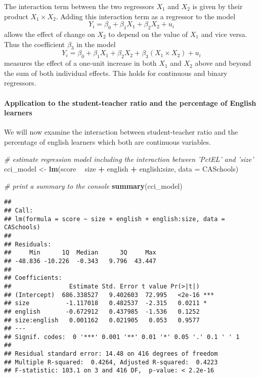 \documentclass[]{book}
\newenvironment{Shaded}{\begin{snugshade}}{\end{snugshade}}
\newcommand{\KeywordTok}[1]{\textcolor[rgb]{0.13,0.29,0.53}{\textbf{#1}}}
\newcommand{\DataTypeTok}[1]{\textcolor[rgb]{0.13,0.29,0.53}{#1}}
\newcommand{\StringTok}[1]{\textcolor[rgb]{0.31,0.60,0.02}{#1}}
\newcommand{\CommentTok}[1]{\textcolor[rgb]{0.56,0.35,0.01}{\textit{#1}}}
\newcommand{\OperatorTok}[1]{\textcolor[rgb]{0.81,0.36,0.00}{\textbf{#1}}}
\newcommand{\NormalTok}[1]{#1}
\let\oldparagraph\paragraph
\renewcommand{\paragraph}[1]{\oldparagraph{#1}\mbox{}}
\theoremstyle{definition}
\theoremstyle{definition}
\theoremstyle{definition}
\theoremstyle{remark}
\begin{document}
The interaction term between the two regressors \(X_1\) and \(X_2\) is
given by their product \(X_1 \times X_2\). Adding this interaction term
as a regressor to the model
\[ Y_i = \beta_0 + \beta_1 X_1 + \beta_2 X_2 + u_i \] allows the effect
of change on \(X_2\) to depend on the value of \(X_1\) and vice versa.
Thus the coefficient \(\beta_3\) in the model
\[ Y_i = \beta_0 + \beta_1 X_1 + \beta_2 X_2 + \beta_3 (X_1 \times X_2) + u_i \]
measures the effect of a one-unit increase in both \(X_1\) and \(X_2\)
above and beyond the sum of both individual effects. This holds for
continuous and binary regressors.

\paragraph{Application to the student-teacher ratio and the percentage
of English
learners}\label{application-to-the-student-teacher-ratio-and-the-percentage-of-english-learners-2}

We will now examine the interaction between student-teacher ratio and
the percentage of english learners which both are continuous variables.

\begin{Shaded}
\begin{Highlighting}[]
\CommentTok{# estimate regression model including the interaction between 'PctEL' and 'size'}
\NormalTok{cci_model <-}\StringTok{ }\KeywordTok{lm}\NormalTok{(score }\OperatorTok{~}\StringTok{ }\NormalTok{size }\OperatorTok{+}\StringTok{ }\NormalTok{english }\OperatorTok{+}\StringTok{ }\NormalTok{english}\OperatorTok{:}\NormalTok{size, }\DataTypeTok{data =}\NormalTok{ CASchools) }

\CommentTok{# print a summary to the console}
\KeywordTok{summary}\NormalTok{(cci_model)}
\end{Highlighting}
\end{Shaded}

\begin{verbatim}
## 
## Call:
## lm(formula = score ~ size + english + english:size, data = CASchools)
## 
## Residuals:
##     Min      1Q  Median      3Q     Max 
## -48.836 -10.226  -0.343   9.796  43.447 
## 
## Coefficients:
##                Estimate Std. Error t value Pr(>|t|)    
## (Intercept)  686.338527   9.402603  72.995   <2e-16 ***
## size          -1.117018   0.482537  -2.315   0.0211 *  
## english       -0.672912   0.437985  -1.536   0.1252    
## size:english   0.001162   0.021905   0.053   0.9577    
## ---
## Signif. codes:  0 '***' 0.001 '**' 0.01 '*' 0.05 '.' 0.1 ' ' 1
## 
## Residual standard error: 14.48 on 416 degrees of freedom
## Multiple R-squared:  0.4264, Adjusted R-squared:  0.4223 
## F-statistic: 103.1 on 3 and 416 DF,  p-value: < 2.2e-16
\end{verbatim}
\end{document}
